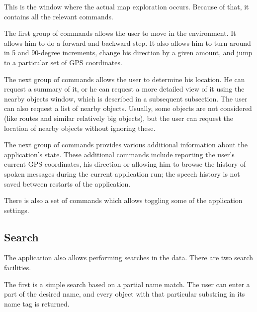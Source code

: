 \documentclass[nolof,digital]{fithesis3}
\begin{document}
This is the window where the actual map exploration occurs. Because of that, it contains all the relevant commands.

The first group of commands allows the user to move in the environment. It allows him to do a forward and backward step. It also allows him to turn around in 5 and 90-degree increments, change his direction by a given amount, and jump to a particular set of GPS coordinates.

The next group of commands allows the user to determine his location. He can request a summary of it, or he can request a more detailed view of it using the nearby objects window, which is described in a subsequent subsection. The user can also request a list of nearby objects. Usually, some objects are not considered (like routes and similar relatively big objects), but the user can request the location of nearby objects without ignoring these.

The next group of commands provides various additional information about the application's state. These additional commands include reporting the user's current GPS coordinates, his direction or allowing him to browse the history of spoken messages during the current application run; the speech history is not saved between restarts of the application.

There is also a set of commands which allows toggling some of the application settings.
\subsection{Search}
The application also allows performing searches in the data. There are two search facilities.

The first is a simple search based on a partial name match. The user can enter a part of the desired name, and every object with that particular substring in its name tag is returned.
\end{document}

